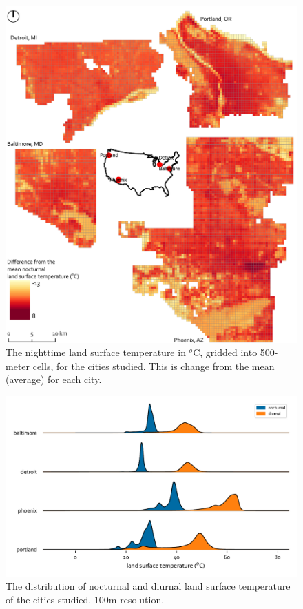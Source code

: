 \documentclass[final,3p,times,twocolumn,sort&compress]{elsarticle}
\begin{document}
\begin{figure}
    \centering
    \includegraphics[width=\textwidth]{fig/report/map_nocturnal_lst.pdf}
    \caption[The nighttime land surface temperature in $^o$C, gridded into 500-meter cells, for the cities studied]{The nighttime land surface temperature in $^o$C, gridded into 500-meter cells, for the cities studied. This is change from the mean (average) for each city.}
    \label{fig:map}
\end{figure}


\begin{figure}
    \centering
    \includegraphics[width=\linewidth]{fig/report/joyplot_lst_100.pdf}
    \caption{The distribution of nocturnal and diurnal land surface temperature of the cities studied. 100m resolution.}
    \label{fig:joy}
\end{figure}
\end{document}
